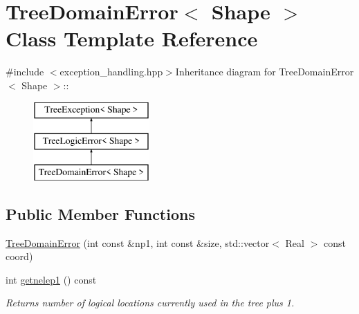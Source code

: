 \hypertarget{classTreeDomainError}{
\section{TreeDomainError$<$ Shape $>$ Class Template Reference}
\label{classTreeDomainError}
}


{\ttfamily \#include $<$exception\_\-handling.hpp$>$}Inheritance diagram for TreeDomainError$<$ Shape $>$::\begin{figure}[H]
\begin{center}
\leavevmode
\includegraphics[height=3cm]{classTreeDomainError}
\end{center}
\end{figure}
\subsection*{Public Member Functions}
\begin{DoxyCompactItemize}
\item 
\hyperlink{classTreeDomainError_a36c6d072485354991aa96f295f545f2c}{TreeDomainError} (int const \&np1, int const \&size, std::vector$<$ Real $>$ const coord)
\item 
\hypertarget{classTreeDomainError_a5f366c57baa089fed8fd70dd1039c9a8}{
int \hyperlink{classTreeDomainError_a5f366c57baa089fed8fd70dd1039c9a8}{getnelep1} () const }
\label{classTreeDomainError_a5f366c57baa089fed8fd70dd1039c9a8}

\begin{DoxyCompactList}\small\item\em Returns number of logical locations currently used in the tree plus 1. \item\end{DoxyCompactList}\end{DoxyCompactItemize}
